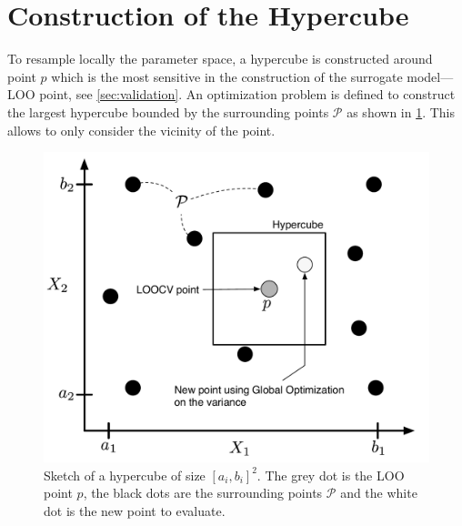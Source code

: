 \section{Construction of the Hypercube}
\label{sec:hypercube}

To resample locally the parameter space, a hypercube is constructed around point $p$ which is the most sensitive in the construction of the surrogate model---LOO point, see \cref{sec:validation}. An optimization problem is defined to construct the largest hypercube bounded by the surrounding points $\mathcal{P}$ as shown in \cref{fig:hypercube}. This allows to only consider the vicinity of the point.

\begin{figure}[h]
\centering
\includegraphics[width=0.8\linewidth,keepaspectratio]{fig/contributions/resample/2_1column_color-online-only_hypercube.pdf}
\caption{Sketch of a hypercube of size $[a_i, b_i]^2$. The grey dot is the LOO point $p$, the black dots are the surrounding points $\mathcal{P}$ and the white dot is the new point to evaluate.}
\label{fig:hypercube}
\end{figure}

